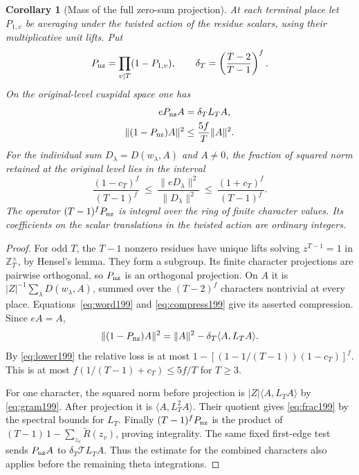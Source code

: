 \documentclass[a4paper,11pt]{article}
\newtheorem{corollary}[proposition]{Corollary}
\theoremstyle{definition}
\theoremstyle{remark}
\newcommand{\ZZ}{\mathbb Z}\newcommand{\ord}{\operatorname{ord}}
\numberwithin{equation}{section}
\begin{document}
\begin{corollary}[Mass of the full zero-sum projection]
\label{cor:whole199}
At each terminal place let \(P_{1,v}\) be averaging under the
twisted action of the residue scalars, using their multiplicative
unit lifts. Put
\[
        P_{\rm nz}=\prod_{v\mid T}(1-P_{1,v}),\qquad
        \delta_T=\left(\frac{T-2}{T-1}\right)^f .
\]
On the original-level cuspidal space one has
\begin{align}
        eP_{\rm nz} A&=\delta_T L_T A, \notag\\
        \|(1-P_{\rm nz})A\|^2
            &\le \frac{5f}{T}\|A\|^2 .               \label{eq:all199}
\end{align}
For the individual sum \(D_\lambda=D(w_\lambda,A)\) and
\(A\ne0\), the fraction of squared norm retained at the
original level lies in the interval
\begin{equation}
 \frac{(1-c_T)^f}{(T-1)^f}\ \le\
       \frac{\|eD_\lambda\|^2}{\|D_\lambda\|^2}
         \ \le\ \frac{(1+c_T)^f}{(T-1)^f}.             \label{eq:frac199}
\end{equation}
The operator \((T-1)^fP_{\rm nz}\) is integral over the ring
of finite character values. Its coefficients on the scalar
translations in the twisted action are ordinary integers.
\end{corollary}
\begin{proof}
For odd \(T\), the \(T-1\) nonzero residues have unique lifts
solving \(z^{T-1}=1\) in \(\ZZ_T^\times\), by Hensel's lemma.
They form a subgroup. Its finite character projections are
pairwise orthogonal, so \(P_{\rm nz}\) is an orthogonal projection.
On \(A\) it is \(|Z|^{-1}\sum_\lambda D(w_\lambda,A)\),
summed over the \((T-2)^f\) characters nontrivial at every
place. Equations~\eqref{eq:word199} and \eqref{eq:compress199}
give its asserted compression. Since \(eA=A\),
\[
 \|(1-P_{\rm nz})A\|^2=\|A\|^2-\delta_T\langle A,L_TA\rangle .
\]
By \eqref{eq:lower199} the relative loss is at most
\(1-[(1-1/(T-1))(1-c_T)]^f\).
This is at most \(f(1/(T-1)+c_T)\le5f/T\) for \(T\ge3\).

For one character, the squared norm before projection is
\(|Z|\langle A,L_TA\rangle\) by \eqref{eq:gram199}.
After projection it is \(\langle A,L_T^2A\rangle\).
Their quotient gives \eqref{eq:frac199} by the spectral bounds
for \(L_T\). Finally \((T-1)^fP_{\rm nz}\) is the product of
\((T-1)\,1-\sum_{z_v}\widetilde R(z_v)\), proving integrality.
The same fixed first-edge test sends \(P_{\rm nz}A\) to
\(\delta_T\mathcal T L_TA\). Thus the estimate for the combined
characters also applies before the remaining theta integrations.
\end{proof}
\end{document}
